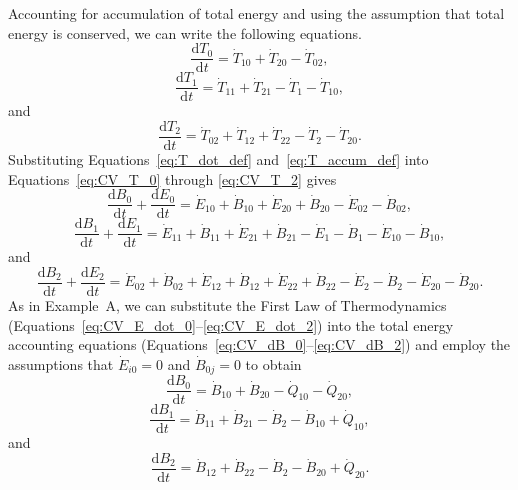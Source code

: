 Accounting for accumulation of total energy
and using the assumption 
that total energy is conserved, we can write the following equations.
%
\begin{equation} \label{eq:CV_T_0}
	\frac{\mathrm{d}T_{0}}{\mathrm{d}t} 	 
	= \dot{T}_{10} 
	+ \dot{T}_{20} 
	- \dot{T}_{02},
\end{equation}
%
\begin{equation} \label{eq:CV_T_1}
	\frac{\mathrm{d}T_{1}}{\mathrm{d}t} 	 
	= \dot{T}_{11}
	+ \dot{T}_{21} 
	- \dot{T}_{1}
	- \dot{T}_{10},
\end{equation}
%
and
%
\begin{equation} \label{eq:CV_T_2}
	\frac{\mathrm{d}T_{2}}{\mathrm{d}t} 	 
	= \dot{T}_{02} 
	+ \dot{T}_{12}
	+ \dot{T}_{22} 
	- \dot{T}_{2} 
	- \dot{T}_{20}.
\end{equation}
%
Substituting Equations~\ref{eq:T_dot_def} 
and~\ref{eq:T_accum_def} into 
Equations~\ref{eq:CV_T_0} through
\ref{eq:CV_T_2} gives
%
\begin{equation} \label{eq:CV_dB_0}
	\frac{\mathrm{d}B_{0}}{\mathrm{d}t} 
	+ \frac{\mathrm{d}E_{0}}{\mathrm{d}t} 
	= \dot{E}_{10} 
	+ \dot{B}_{10} 
	+ \dot{E}_{20} 
	+ \dot{B}_{20} 
	- \dot{E}_{02} 
	- \dot{B}_{02},
\end{equation}
%
\begin{equation} \label{eq:CV_dB_1}
	\frac{\mathrm{d}B_{1}}{\mathrm{d}t} 
	+ \frac{\mathrm{d}E_{1}}{\mathrm{d}t} 
	= \dot{E}_{11}
	+ \dot{B}_{11}
	+ \dot{E}_{21} 
	+ \dot{B}_{21} 
	- \dot{E}_1
	- \dot{B}_1
	- \dot{E}_{10} 
	- \dot{B}_{10},
\end{equation}
%
and 
%
\begin{equation} \label{eq:CV_dB_2}
	\frac{\mathrm{d}B_{2}}{\mathrm{d}t} 
	+ \frac{\mathrm{d}E_{2}}{\mathrm{d}t} 
	= \dot{E}_{02} 
	+ \dot{B}_{02} 
	+ \dot{E}_{12}
	+ \dot{B}_{12}
	+ \dot{E}_{22} 
	+ \dot{B}_{22} 
	- \dot{E}_{2} 
	- \dot{B}_{2} 
	- \dot{E}_{20} 
	- \dot{B}_{20}.
\end{equation}
%
As in Example~A, we can substitute the 
First Law of Thermodynamics
(Equations~\ref{eq:CV_E_dot_0}--\ref{eq:CV_E_dot_2})
into the total energy accounting equations
(Equations~\ref{eq:CV_dB_0}--\ref{eq:CV_dB_2}) 
and employ the assumptions that 
$\dot{E}_{i0} = 0$ and
$\dot{B}_{0j} = 0$ 
to obtain
%
\begin{equation} \label{eq:B_embodied_energy_accounting_0}
	\frac{\mathrm{d}B_{0}}{\mathrm{d}t} 
	= \dot{B}_{10} 
	+ \dot{B}_{20} 
	- \dot{Q}_{10} 
	- \dot{Q}_{20}, 
\end{equation}
%
\begin{equation} \label{eq:B_embodied_energy_accounting_1}
	\frac{\mathrm{d}B_{1}}{\mathrm{d}t} 
	= \dot{B}_{11} 
	+ \dot{B}_{21}
	- \dot{B}_{2} 
	- \dot{B}_{10}
	+ \dot{Q}_{10},
\end{equation}
%
and
%
\begin{equation} \label{eq:B_embodied_energy_accounting_2}
	\frac{\mathrm{d}B_2}{\mathrm{d}t} 
	= \dot{B}_{12} 
	+ \dot{B}_{22} 
	- \dot{B}_{2}
	- \dot{B}_{20} 
	+ \dot{Q}_{20}.
\end{equation}

